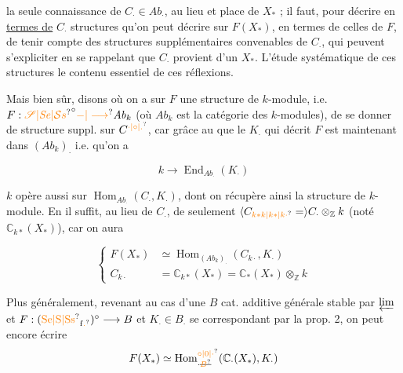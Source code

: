 
la seule connaissance de $C_{\cdot}\in\mathit{Ab}_{\cdot}$, au lieu
et place de $X_{\ast}$ ; il faut, pour  
décrire en \uline{termes de} $C_{\cdot}$   structures
qu'on peut  décrire sur $F(X_{\ast})$, en termes
de celles de $F$, de tenir compte des
structures supplémentaires convenables
de $C_{\cdot}$, qui peuvent s'expliciter en se
rappelant que $C_{\cdot}$ provient d'un $X_{\ast}$. 
L'étude systématique de ces structures 
  le contenu essentiel de ces réflexions.

Mais bien sûr,    disons
où on a sur $F$ une structure de
$k$-module, i.e. $F:\unsure{\mathscr S|\mathit{Se}|\mathcal{S}s}^{\circ}\unsure{\mathbin{-}|\longrightarrow}\mathit{Ab}_k$
(où $\mathit{Ab}_k$ est la catégorie des $k$-modules),
  de se donner de structure
suppl. sur $C^{\unsure{\cdot|\circ|.}}$, car  grâce au 
que le $K_{\cdot}$ qui décrit $F$ est
maintenant dans $(\mathit{Ab}_k)_{\cdot}$ i.e. qu'on a

\[
k\longrightarrow\operatorname{End}_{\mathit{Ab}_{\cdot}}(K_{\cdot})
\]

$k$ opère aussi sur $\operatorname{Hom}_{\mathit{Ab}_{\cdot}}(C_{\cdot},K_{\cdot})$,
dont on récupère ainsi la structure
de $k$-module. En  il suffit,
au lieu de $C_{\cdot}$, de 
seulement $\inserted{C_{\unsure{k\ast k|k\ast|k\cdot}}=}C_{\cdot}\otimes_{\mathbb Z} k$ (noté $\mathbb C_{k\ast}(X_{\ast})$),
car on aura

\[
\left\{\begin{aligned}
F(X_{\ast})&\simeq\operatorname{Hom}_{(\mathit{Ab}_k)_{\cdot}}(C_{k\cdot},K_{\cdot})\\
C_{k\cdot}&=\mathbb C_{k\ast}(X_{\ast})=\mathbb C_{\ast}(X_{\ast})\otimes_{\mathbb Z} k
\end{aligned}\right.
\]

Plus généralement, revenant au cas d'une
$B$ cat. additive générale stable par $\varprojlim$
et $F:(\mathrm{\unsure{Se|S|Ss}}_{\mathrm{f}\unsure{.}})^{\circ}\longrightarrow B$ et $K_{\cdot}\in B_{\cdot}$ se correspondant par la prop. 2, on peut encore
écrire
\[
F(X_{\ast})\simeq\operatorname{Hom}_{\cdot\deleted{\unsure{B}}}^{\unsure{\circ|0|\cdot}}(\mathbb C_{\cdot}(X_{\ast}),K_{\cdot})
\]

